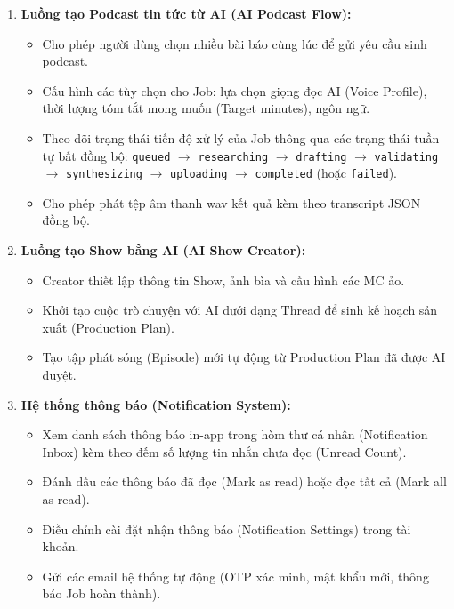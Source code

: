 \documentclass[12pt,a4paper]{report}
\begin{document}
\begin{enumerate}
\begin{itemize}
    \end{itemize}
    \item \textbf{Luồng tạo Podcast tin tức từ AI (AI Podcast Flow):}
    \begin{itemize}
        \item Cho phép người dùng chọn nhiều bài báo cùng lúc để gửi yêu cầu sinh podcast.
        \item Cấu hình các tùy chọn cho Job: lựa chọn giọng đọc AI (Voice Profile), thời lượng tóm tắt mong muốn (Target minutes), ngôn ngữ.
        \item Theo dõi trạng thái tiến độ xử lý của Job thông qua các trạng thái tuần tự bất đồng bộ: \texttt{queued} $\to$ \texttt{researching} $\to$ \texttt{drafting} $\to$ \texttt{validating} $\to$ \texttt{synthesizing} $\to$ \texttt{uploading} $\to$ \texttt{completed} (hoặc \texttt{failed}).
        \item Cho phép phát tệp âm thanh wav kết quả kèm theo transcript JSON đồng bộ.
    \end{itemize}
    \item \textbf{Luồng tạo Show bằng AI (AI Show Creator):}
    \begin{itemize}
        \item Creator thiết lập thông tin Show, ảnh bìa và cấu hình các MC ảo.
        \item Khởi tạo cuộc trò chuyện với AI dưới dạng Thread để sinh kế hoạch sản xuất (Production Plan).
        \item Tạo tập phát sóng (Episode) mới tự động từ Production Plan đã được AI duyệt.
    \end{itemize}
    \item \textbf{Hệ thống thông báo (Notification System):}
    \begin{itemize}
        \item Xem danh sách thông báo in-app trong hòm thư cá nhân (Notification Inbox) kèm theo đếm số lượng tin nhắn chưa đọc (Unread Count).
        \item Đánh dấu các thông báo đã đọc (Mark as read) hoặc đọc tất cả (Mark all as read).
        \item Điều chỉnh cài đặt nhận thông báo (Notification Settings) trong tài khoản.
        \item Gửi các email hệ thống tự động (OTP xác minh, mật khẩu mới, thông báo Job hoàn thành).
    \end{itemize}
\end{enumerate}
\end{document}

